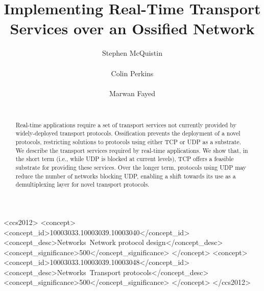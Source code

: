 \documentclass{sig-alternate-05-2015}
\begin{document}
\title{Implementing Real-Time Transport Services over an Ossified Network}
\author{
  \alignauthor
    Stephen McQuistin\\
    \\
  \alignauthor
    Colin Perkins\\
    \\
  \alignauthor
    Marwan Fayed\\
    \\
}

\toappear{}
\maketitle
\begin{abstract}


Real-time applications require a set of transport services not currently
provided by widely-deployed transport protocols. Ossification prevents the
deployment of a novel protocols, restricting solutions to protocols using
either TCP or UDP as a substrate. We describe the transport services
required by real-time applications. We show that, in the short term (i.e.,
while UDP is blocked at current levels), TCP offers a feasible substrate
for providing these services. Over the longer term, protocols using UDP
may reduce the number of networks blocking UDP, enabling a shift towards
its use as a demultiplexing layer for novel transport protocols.

\end{abstract}
\begin{CCSXML}
  <ccs2012>
    <concept>
      <concept_id>10003033.10003039.10003040</concept_id>
      <concept_desc>Networks~Network protocol design</concept_desc>
      <concept_significance>500</concept_significance>
    </concept>
    <concept>
      <concept_id>10003033.10003039.10003048</concept_id>
      <concept_desc>Networks~Transport protocols</concept_desc>
      <concept_significance>500</concept_significance>
    </concept>
  </ccs2012>
\end{CCSXML}
\end{document}
